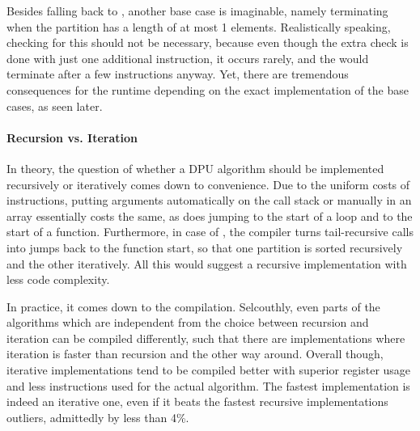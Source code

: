 Besides falling back to \IS{}, another base case is imaginable, namely terminating when the partition has a length of at most 1 elements.
Realistically speaking, checking for this should not be necessary, because even though the extra check is done with just one additional instruction, it occurs rarely, and the \IS{} would terminate after a few instructions anyway.
Yet, there are tremendous consequences for the runtime depending on the exact implementation of the base cases, as seen later.


\paragraph{Recursion vs. Iteration}
In theory, the question of whether a DPU algorithm should be implemented recursively or iteratively comes down to convenience.
Due to the uniform costs of instructions, putting arguments automatically on the call stack or manually in an array essentially costs the same, as does jumping to the start of a loop and to the start of a function.
Furthermore, in case of \QS{}, the compiler turns tail-recursive calls into jumps back to the function start, so that one partition is sorted recursively and the other iteratively.
All this would suggest a recursive implementation with less code complexity.

In practice, it comes down to the compilation.
Selcouthly, even parts of the algorithms which are independent from the choice between recursion and iteration can be compiled differently, such that there are implementations where iteration is faster than recursion and the other way around.
Overall though, iterative implementations tend to be compiled better with superior register usage and less instructions used for the actual \QS{} algorithm.
The fastest implementation is indeed an iterative one, even if it beats the fastest recursive implementations \Dash outliers, admittedly \Dash by less than 4\%.


